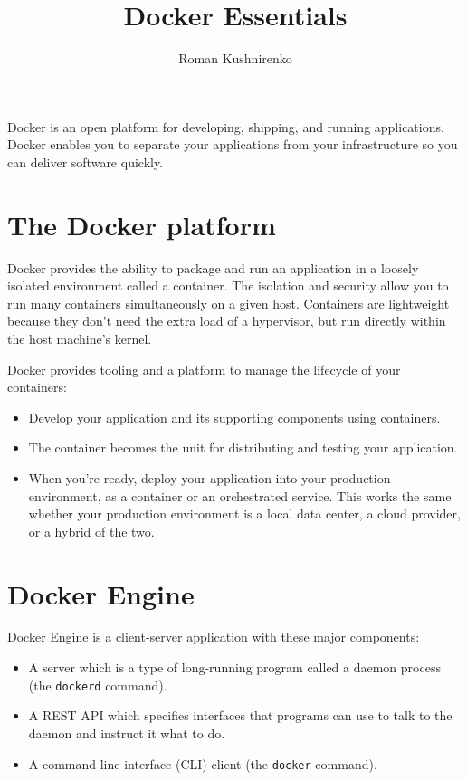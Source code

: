\documentclass{article}
\title{Docker Essentials}
\author{Roman Kushnirenko}
\begin{document}
	\maketitle
	
Docker is an open platform for developing, shipping, and running applications. Docker enables you to separate your applications from your infrastructure so you can deliver software quickly.

	\section{The Docker platform}

Docker provides the ability to package and run an application in a loosely isolated environment called a container. The isolation and security allow you to run many containers simultaneously on a given host. Containers are lightweight because they don’t need the extra load of a hypervisor, but run directly within the host machine’s kernel.

Docker provides tooling and a platform to manage the lifecycle of your containers:

\begin{itemize}
  \item Develop your application and its supporting components using containers.
  \item The container becomes the unit for distributing and testing your application.
  \item When you’re ready, deploy your application into your production environment, as a container or an orchestrated service. This works the same whether your production environment is a local data center, a cloud provider, or a hybrid of the two.
\end{itemize}

	\section{Docker Engine}

Docker Engine is a client-server application with these major components:

\begin{itemize}
  \item A server which is a type of long-running program called a daemon process (the \texttt{dockerd} command).
  \item A REST API which specifies interfaces that programs can use to talk to the daemon and instruct it what to do.
  \item A command line interface (CLI) client (the \texttt{docker} command).
\end{itemize}
\end{document}
